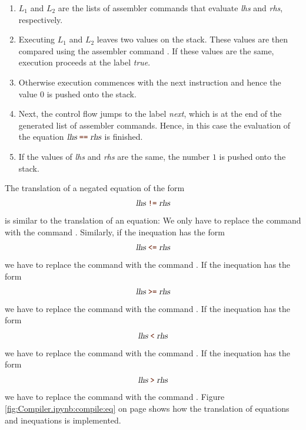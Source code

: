 \begin{enumerate}
\item $L_1$ and $L_2$ are the lists of assembler commands that evaluate  \textsl{lhs} and \textsl{rhs}, respectively.
\item Executing $L_1$ and $L_2$ leaves two values on the stack.  These values are then compared using the
      assembler command .  If these values are the same, execution proceeds at the label
      \textsl{true}.
\item Otherwise execution commences with the next instruction and hence the value $0$ is pushed onto the stack.
\item Next, the control flow jumps to the label \textsl{next}, which is at the end of the generated
      list of assembler commands.  Hence, in this case the evaluation of the equation
      $\textsl{lhs}\; \mytt{==} \;\textsl{rhs}$ is finished. 
\item If the values of \textsl{lhs} and \textsl{rhs} are the same, the number $1$
      is pushed onto the stack.
\end{enumerate}
The translation of a negated equation of the form
\[ \textsl{lhs}\;\mytt{!=}\;\textsl{rhs} \]
is similar to the translation of an equation:  We only have to replace the command  with the
command .  Similarly, if the inequation has the form
\[ \textsl{lhs}\;\mytt{<=}\;\textsl{rhs} \]
we have to replace the command  with the command .
If the inequation has the form
\[ \textsl{lhs}\;\mytt{>=}\;\textsl{rhs} \]
we have to replace the command  with the command .
If the inequation has the form
\[ \textsl{lhs}\;\mytt{<}\;\textsl{rhs} \]
we have to replace the command  with the command .
If the inequation has the form
\[ \textsl{lhs}\;\mytt{>}\;\textsl{rhs} \]
we have to replace the command  with the command .
Figure \ref{fig:Compiler.ipynb:compile:eq} on page \pageref{fig:Compiler.ipynb:compile:eq} shows how the
translation of equations and inequations is implemented.  

